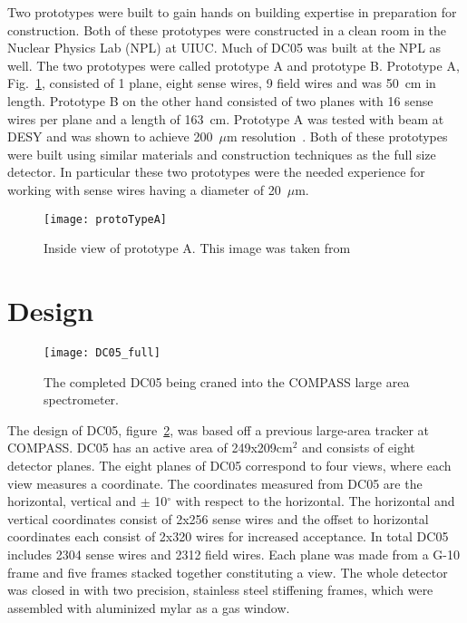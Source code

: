 Two prototypes were built to gain hands on building expertise in preparation for
construction.  Both of these prototypes were constructed in a clean room in the
Nuclear Physics Lab (NPL) at UIUC.  Much of DC05 was built at the NPL as well.
The two prototypes were called prototype A and prototype B.  Prototype A,
Fig.~\ref{fig::protoTypeA}, consisted of 1 plane, eight sense wires, 9 field
wires and was 50~cm in length.  Prototype B on the other hand consisted of two
planes with 16 sense wires per plane and a length of 163~cm.  Prototype A was
tested with beam at DESY and was shown to achieve 200~$\mu$m
resolution~\cite{choi}.  Both of these prototypes were built using similar
materials and construction techniques as the full size detector.  In particular
these two prototypes were the needed experience for working with sense wires
having a diameter of 20~$\mu$m.

\begin{figure}[h!t]
  \centering \texttt{[image: protoTypeA]}
  \caption{Inside view of prototype A.  This image was taken from~\cite{choi} }
  \label{fig::protoTypeA}
\end{figure}


\section{Design}

\begin{figure}
  \centering \texttt{[image: DC05\_full]}
  \caption{}{The completed DC05 being craned into the COMPASS large area
    spectrometer.}
  \label{fig:DC05}%
\end{figure}

The design of DC05, figure~\ref{fig:DC05}, was based off a previous large-area
tracker at COMPASS.  DC05 has an active area of 249x209cm$^2$ and consists of
eight detector planes.  The eight planes of DC05 correspond to four views, where
each view measures a coordinate.  The coordinates measured from DC05 are the
horizontal, vertical and $\pm$ 10$^{\circ}$ with respect to the horizontal.  The
horizontal and vertical coordinates consist of 2x256 sense wires and the offset
to horizontal coordinates each consist of 2x320 wires for increased acceptance.
In total DC05 includes 2304 sense wires and 2312 field wires.  Each plane was
made from a G-10 frame and five frames stacked together constituting a view.
The whole detector was closed in with two precision, stainless steel stiffening
frames, which were assembled with aluminized mylar as a gas window.

